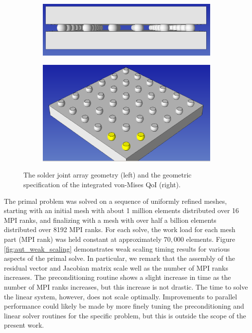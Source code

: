 \begin{figure}[ht!]
\centering
\begin{subfigure}{.5\textwidth}
\centering
\includegraphics[width=.99\linewidth]{img/aut_solder_geom.png}
\end{subfigure}%
\begin{subfigure}{0.5\textwidth}
\centering
\includegraphics[width=.99\linewidth]{img/aut_solder_qoi_geom.png}
\end{subfigure}
\caption{The solder joint array geometry (left) and the
geometric specification of the integrated von-Mises QoI
(right).}
\label{fig:aut_solder_geom}
\end{figure}

The primal problem was solved on a sequence of uniformly refined
meshes, starting with an initial mesh with about 1 million
elements distributed over 16 MPI ranks, and finalizing with a
mesh with over half a billion elements distributed over
8192 MPI ranks. For each solve, the work load for each mesh
part (MPI rank) was held constant at approximately
$70,000$ elements. Figure \ref{fig:aut_weak_scaling}
demonstrates weak scaling timing results for various aspects
of the primal solve. In particular, we remark that the
assembly of the residual vector and Jacobian matrix scale
well as the number of MPI ranks increases. The preconditioning
routine shows a slight increase in time as the number of
MPI ranks increases, but this increase is not drastic.
The time to solve the linear system, however, does not scale
optimally. Improvements to parallel performance could likely
be made by more finely tuning the preconditioning and linear
solver routines for the specific problem, but this is outside
the scope of the present work.

